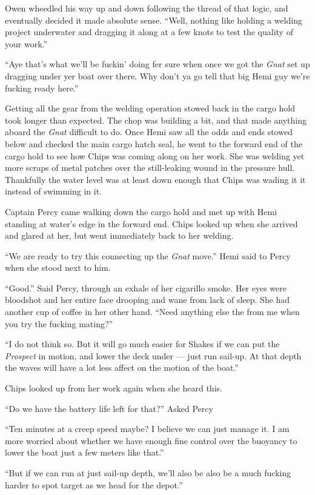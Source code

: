 \documentclass[]{scrbook}
\begin{document}
Owen wheedled his way up and down following the thread of that logic,
and eventually decided it made absolute sense. ``Well, nothing like
holding a welding project underwater and dragging it along at a few
knots to test the quality of your work.''

``Aye that's what we'll be fuckin' doing fer sure when once we got the
\emph{Gnat} set up dragging under yer boat over there. Why don't ya go
tell that big Hemi guy we're fucking ready here.''

Getting all the gear from the welding operation stowed back in the cargo
hold took longer than expected. The chop was building a bit, and that
made anything aboard the \emph{Gnat} difficult to do. Once Hemi saw all
the odds and ends stowed below and checked the main cargo hatch seal, he
went to the forward end of the cargo hold to see how Chips was coming
along on her work. She was welding yet more scraps of metal patches over
the still-leaking wound in the pressure hull. Thankfully the water level
was at least down enough that Chips was wading it it instead of swimming
in it.

Captain Percy came walking down the cargo hold and met up with Hemi
standing at water's edge in the forward end. Chips looked up when she
arrived and glared at her, but went immediately back to her welding.

``We are ready to try this connecting up the \emph{Gnat} move.'' Hemi
said to Percy when she stood next to him.

``Good.'' Said Percy, through an exhale of her cigarillo smoke. Her eyes
were bloodshot and her entire face drooping and wane from lack of sleep.
She had another cup of coffee in her other hand. ``Need anything else
the from me when you try the fucking mating?''

``I do not think so. But it will go much easier for Shakes if we can put
the \emph{Prospect} in motion, and lower the deck under --- just run
sail-up. At that depth the waves will have a lot less affect on the
motion of the boat.''

Chips looked up from her work again when she heard this.

``Do we have the battery life left for that?'' Asked Percy

``Ten minutes at a creep speed maybe? I believe we can just manage it. I
am more worried about whether we have enough fine control over the
buoyancy to lower the boat just a few meters like that.''

``But if we can run at just sail-up depth, we'll also be also be a much
fucking harder to spot target as we head for the depot.''
\end{document}
